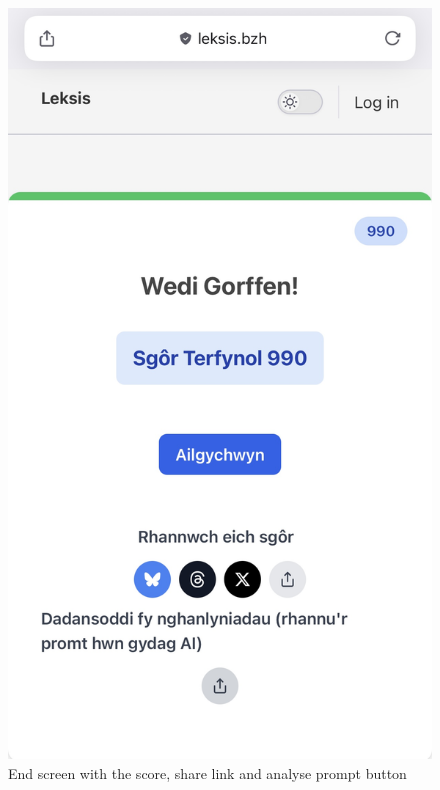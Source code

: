 \begin{figure}[htbp]
    \centering
    \includegraphics[height=0.7\textwidth]{figures/end-screen.jpg}
    \caption{End screen with the score, share link and analyse prompt button}
\end{figure}\label{fig:endscreen}